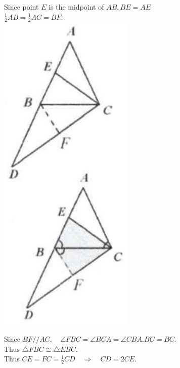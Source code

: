 \documentclass{article}
\begin{document}
Since point \(E\) is the midpoint of \(A B, B E=A E\)\\
\(\frac{1}{2} A B=\frac{1}{2} A C=B F\).\\
\centering
\includegraphics[width=\textwidth]{images/reasoning_image_1.jpg}

Since \(B F / / A C, \quad \angle F B C=\angle B C A=\angle C B A . B C=B C\).\\
Thus \(\triangle F B C \cong \triangle E B C\).\\
Thus \(C E=F C=\frac{1}{2} C D \quad \Rightarrow \quad C D=2 C E\).
\end{document}
